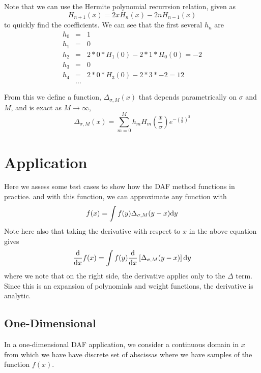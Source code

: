 \documentclass[preprint]{revtex4}
\begin{document}
Note that we can use the Hermite polynomial recurrsion relation, given as
\begin{equation}
\label{eqn_HermiteRecur}
H_{n+1}(x) = 2xH_n(x)-2nH_{n-1}(x)
\end{equation}
to quickly find the coefficients. We can see that the first several $h_n$  are
\begin{eqnarray}
h_0 & =&  1 \nonumber \\
h_1 &=& 0 \nonumber \\
h_2 &=& 2*0*H_1(0)-2*1*H_0(0) = -2 \nonumber \\
h_3 &=& 0 \nonumber \\
h_4 &=& 2*0*H_3(0) - 2*3*-2= 12 \nonumber \\
&...& \nonumber
\end{eqnarray}

From this we define a function, $\Delta_{\sigma,M}(x)$ that depends parametrically on
$\sigma$ and $M$, and is exact as $M\to\infty$, 
\begin{equation}
\label{eqn_DeltaExpansion}
\Delta_{\sigma,M}(x) = \sum_{m=0}^M h_m H_m \left(\frac{x}{\sigma}\right)e^{- \left(\frac{x}{\sigma}\right)^2}
\end{equation}


\section{Application}

Here we assess some test cases to show how the DAF method functions in practice. 
and with this function, we can approximate any function with
\begin{equation}
\label{eqn_f0delta_ident}
f(x) = \int f(y)\Delta_{\sigma,M}(y-x) {\rm d}y
\end{equation}
Note here also that taking the derivative with respect to $x$ in the above equation
gives
\begin{equation}
\label{eqn_f1delta_ident}
\frac{{\rm d}}{{\rm d}x}f(x) = 
    \int f(y) \frac{{\rm d}}{{\rm d}x}\left[\Delta_{\sigma,M}(y-x)\right] {\rm d}y
\end{equation}
where we note that on the right side, the derivative applies only to the $\Delta$ term. 
Since this is an expansion of polynomials and weight functions, the derivative is analytic. 

\subsection{One-Dimensional}
In a one-dimensional DAF application, we consider a continuous domain in $x$ from which
we have have discrete set of abscissas where we have samples of the function $f(x)$. 
\end{document}
